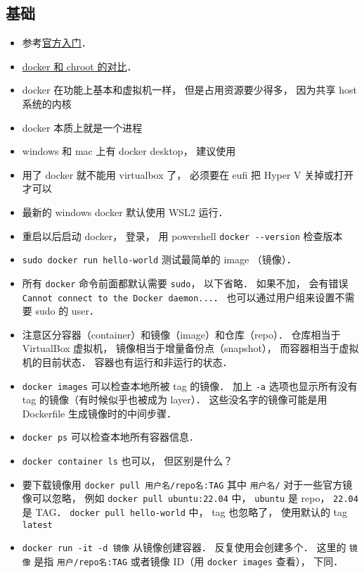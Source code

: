 \subsection{基础}
\begin{itemize}
\item 参考\href{https://docs.docker.com/get-started/}{官方入门}．
\item \href{https://devops.stackexchange.com/questions/2826/difference-between-chroot-and-docker}{docker 和 chroot 的对比}．
\item docker 在功能上基本和虚拟机一样， 但是占用资源要少得多， 因为共享 host 系统的内核
\item docker 本质上就是一个进程
\item windows 和 mac 上有 docker desktop， 建议使用
\item 用了 docker 就不能用 virtualbox 了， 必须要在 eufi 把 Hyper V 关掉或打开才可以
\item 最新的 windows docker 默认使用 WSL2 运行．
\item 重启以后启动 docker， 登录， 用 powershell \verb`docker --version` 检查版本
\item \verb`sudo docker run hello-world` 测试最简单的 image （镜像）．
\item 所有 \verb|docker| 命令前面都默认需要 \verb|sudo|， 以下省略． 如果不加， 会有错误 \verb|Cannot connect to the Docker daemon...|． 也可以通过用户组来设置不需要 sudo 的 user．
\item 注意区分容器（container）和镜像（image）和仓库（repo）． 仓库相当于 VirtualBox 虚拟机， 镜像相当于增量备份点（snapshot）， 而容器相当于虚拟机的目前状态． 容器也有运行和非运行的状态．
\item \verb`docker images` 可以检查本地所被 tag 的镜像． 加上 \verb|-a| 选项也显示所有没有 tag 的镜像（有时候似乎也被成为 layer）． 这些没名字的镜像可能是用 Dockerfile 生成镜像时的中间步骤．
\item \verb`docker ps` 可以检查本地所有容器信息．
\item \verb|docker container ls| 也可以， 但区别是什么？
\item 要下载镜像用 \verb`docker pull 用户名/repo名:TAG` 其中 \verb|用户名/| 对于一些官方镜像可以忽略， 例如 \verb`docker pull ubuntu:22.04` 中， \verb|ubuntu| 是 repo， \verb|22.04| 是 TAG． \verb|docker pull hello-world| 中， tag 也忽略了， 使用默认的 tag \verb|latest|
\item \verb`docker run -it -d 镜像` 从镜像创建容器． 反复使用会创建多个． 这里的 \verb|镜像| 是指 \verb|用户/repo名:TAG| 或者镜像 ID（用 \verb|docker images| 查看）， 下同．

\end{itemize}
